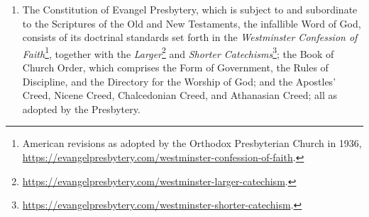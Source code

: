 \documentclass[
]{book}
\providecommand{\tightlist}{%
  \setlength{\itemsep}{0pt}\setlength{\parskip}{0pt}}
\begin{document}
\protect\hypertarget{chapter-slug-29-amending-the-constitution-of-the-church}{\href{}{}}

\begin{enumerate}
\def\labelenumi{\arabic{enumi}.}
\tightlist
\item
  \protect\hypertarget{29}{\href{}{}}\protect\hypertarget{29.1}{\href{}{}}The Constitution of Evangel Presbytery, which is subject to and subordinate to the Scriptures of the Old and New Testaments, the infallible Word of God, consists of its doctrinal standards set forth in the \emph{Westminster Confession of Faith}\footnote{American revisions as adopted by the Orthodox Presbyterian Church in 1936, \url{https://evangelpresbytery.com/westminster-confession-of-faith}.}, together with the \emph{Larger}\footnote{\url{https://evangelpresbytery.com/westminster-larger-catechism}.} and \emph{Shorter Catechisms}\footnote{\url{https://evangelpresbytery.com/westminster-shorter-catechism}.}; the Book of Church Order, which comprises the Form of Government, the Rules of Discipline, and the Directory for the Worship of God; and the Apostles' Creed, Nicene Creed, Chalcedonian Creed, and Athanasian Creed; all as adopted by the Presbytery.
\end{enumerate}
\end{document}
